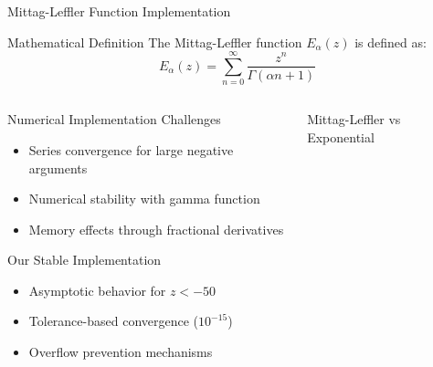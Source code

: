\documentclass[aspectratio=169]{beamer}
\begin{document}
\begin{frame}{Mittag-Leffler Function Implementation}
    \begin{block}{Mathematical Definition}
        The Mittag-Leffler function $E_\alpha(z)$ is defined as:
        \[
        E_\alpha(z) = \sum_{n=0}^{\infty} \frac{z^n}{\Gamma(\alpha n + 1)}
        \]
    \end{block}
    
    \begin{columns}
        \begin{column}{0.6\textwidth}
            \begin{block}{Numerical Implementation Challenges}
                \begin{itemize}
                    \item Series convergence for large negative arguments
                    \item Numerical stability with gamma function
                    \item Memory effects through fractional derivatives
                \end{itemize}
            \end{block}
            
            \begin{block}{Our Stable Implementation}
                \begin{itemize}
                    \item Asymptotic behavior for $z < -50$
                    \item Tolerance-based convergence ($10^{-15}$)
                    \item Overflow prevention mechanisms
                \end{itemize}
            \end{block}
        \end{column}
        
        \begin{column}{0.4\textwidth}
            \begin{center}
                \small{Mittag-Leffler vs Exponential}
            \end{center}
        \end{column}
    \end{columns}
\end{frame}
\end{document}
